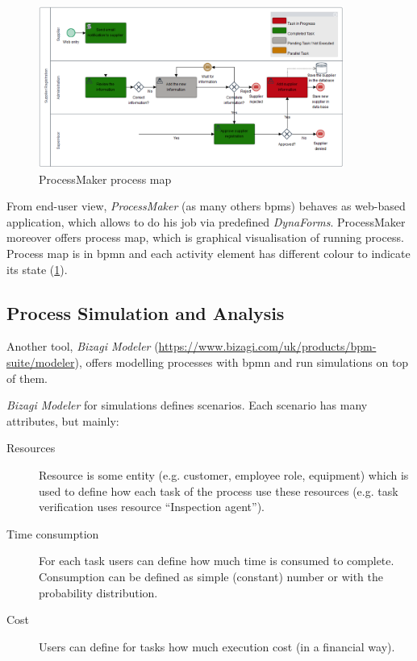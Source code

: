  \begin{figure}[ht!]
	\centering
    \includegraphics[width=10cm, keepaspectratio]{img/process-maker-map.PNG}
    \caption{ProcessMaker process map}
    \label{fig:process-maker-process-map}
\end{figure} 
 
 From end-user view, \textit{ProcessMaker} (as many others \gls{bpms}) behaves as web-based application, which allows to do his job via predefined \textit{DynaForms}. ProcessMaker moreover offers process map, which is graphical visualisation of running process. Process map is in \gls{bpmn} and each activity element has different colour to indicate its state (\cref{fig:process-maker-process-map}).
 
\subsection{Process Simulation and Analysis}
Another tool, \textit{Bizagi Modeler} (\href{https://www.bizagi.com/uk/products/bpm-suite/modeler}{https://www.bizagi.com/uk/products/bpm-suite/modeler}), offers modelling processes with \gls{bpmn} and run simulations on top of them.

\textit{Bizagi Modeler} for simulations defines scenarios. Each scenario has many attributes, but mainly:
\begin{description}
    \item[Resources] Resource is some entity (e.g. customer, employee role, equipment) which is used to define how each task of the process use these resources (e.g. task verification uses resource ``Inspection agent'').
    \item[Time consumption] For each task users can define how much time is consumed to complete. Consumption can be defined as simple (constant) number or with the probability distribution.
    \item[Cost] Users can define for tasks how much execution cost (in a financial way).    
\end{description}

